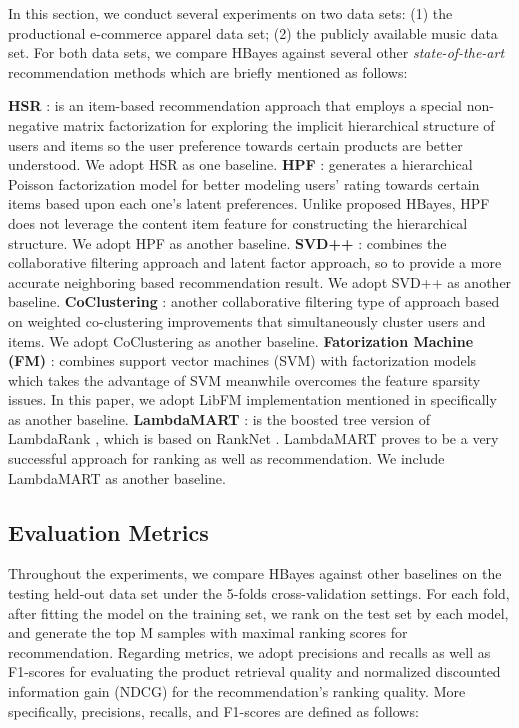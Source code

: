 In this section, we conduct several experiments on two data sets: (1) the productional e-commerce apparel data set; (2) the publicly available music data set.  For both data sets, we compare HBayes against several other \emph{state-of-the-art} recommendation methods which are briefly mentioned as follows:

{\noindent\textbf{HSR} \cite{wang2015exploring}: is an item-based recommendation approach that employs a special non-negative matrix factorization for exploring the implicit hierarchical structure of users and items so the user preference towards certain products are better understood.  We adopt HSR  as one baseline. \newline
\textbf{HPF} \cite{gopalan2015scalable}: generates a hierarchical Poisson factorization model for better modeling users' rating towards certain items based upon each one's latent preferences.  Unlike proposed HBayes, HPF does not leverage the content item feature for constructing the hierarchical structure. We adopt HPF as another baseline. \newline
\textbf{SVD++} \cite{mnih2008probabilistic, koren2008factorization}: combines the collaborative filtering approach and latent factor approach, so to provide a more accurate neighboring based recommendation result.  We adopt SVD++ as another baseline. \newline
\textbf{CoClustering} \cite{george2005scalable}: another collaborative filtering type of approach based on weighted co-clustering improvements that simultaneously cluster users and items.  We adopt CoClustering as another baseline. \newline
\textbf{Fatorization Machine (FM)} \cite{rendle2010factorization,rendle2012factorization}: combines support vector machines (SVM) with factorization models which takes the advantage of SVM meanwhile overcomes the feature sparsity issues.  In this paper, we adopt LibFM implementation mentioned in \cite{rendle2012factorization} specifically as another baseline. \newline
\textbf{LambdaMART} \cite{burges2010ranknet}: is the boosted tree version of LambdaRank \cite{donmez2009local}, which is based on RankNet \cite{burges2005learning}.  LambdaMART proves to be a very successful approach for ranking as well as recommendation.  We include LambdaMART as another baseline. \newline}

\subsection{Evaluation Metrics}
Throughout the experiments, we compare HBayes against other baselines on the testing held-out data set under the 5-folds cross-validation settings.  For each fold, after fitting the model on the training set, we rank on the test set by each model, and generate the top M samples with maximal ranking scores for recommendation.  Regarding metrics, we adopt precisions and recalls as well as F1-scores for evaluating the product retrieval quality and normalized discounted information gain (NDCG) for the recommendation's ranking quality.  More specifically, precisions, recalls, and F1-scores are defined as follows:

